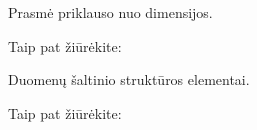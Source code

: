 \documentclass[letterpaper,10pt,lithuanian]{sphinxmanual}
\begin{document}
\begin{fulllineitems}
\label{\detokenize{formatas:ref}}
\pysigstartsignatures
\pysigline
{}
\pysigstopsignatures
\sphinxAtStartPar
{}

\sphinxAtStartPar
Prasmė priklauso nuo dimensijos.


\begin{sphinxseealso}{Taip pat žiūrėkite:}

\begin{DUlineblock}{0em}
\item[] {\hyperref[\detokenize{identifikatoriai:rysiai}]{}}
\item[] {\hyperref[\detokenize{vienetai:matavimo-vienetai}]{}}
\item[] {\hyperref[\detokenize{dimensijos:enum}]{}}
\end{DUlineblock}


\end{sphinxseealso}


\end{fulllineitems}


\begin{fulllineitems}
\label{\detokenize{formatas:source}}
\pysigstartsignatures
\pysigline
{}
\pysigstopsignatures
\sphinxAtStartPar
{}

\sphinxAtStartPar
Duomenų šaltinio struktūros elementai.


\begin{sphinxseealso}{Taip pat žiūrėkite:}

\begin{DUlineblock}{0em}
\item[] {\hyperref[\detokenize{saltiniai:duomenu-saltiniai}]{}}
\end{DUlineblock}


\end{sphinxseealso}


\end{fulllineitems}

\end{document}
